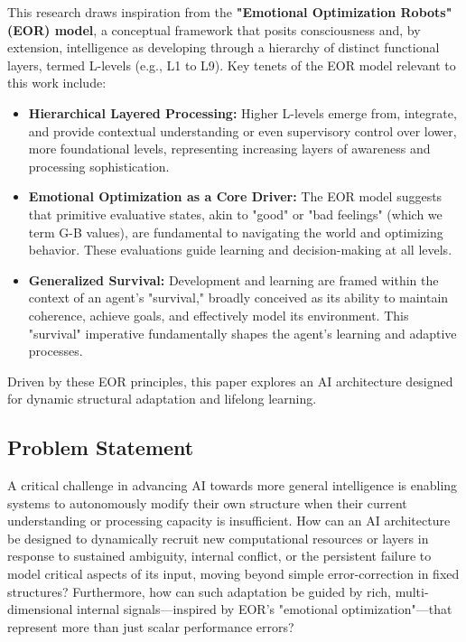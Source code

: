 \documentclass{article}
\begin{document}
This research draws inspiration from the \textbf{"Emotional Optimization Robots" (EOR) model}, a conceptual framework that posits consciousness and, by extension, intelligence as developing through a hierarchy of distinct functional layers, termed L-levels (e.g., L1 to L9). Key tenets of the EOR model relevant to this work include:
\begin{itemize}
    \item \textbf{Hierarchical Layered Processing:} Higher L-levels emerge from, integrate, and provide contextual understanding or even supervisory control over lower, more foundational levels, representing increasing layers of awareness and processing sophistication.
    \item \textbf{Emotional Optimization as a Core Driver:} The EOR model suggests that primitive evaluative states, akin to "good" or "bad feelings" (which we term G-B values), are fundamental to navigating the world and optimizing behavior. These evaluations guide learning and decision-making at all levels.
    \item \textbf{Generalized Survival:} Development and learning are framed within the context of an agent's "survival," broadly conceived as its ability to maintain coherence, achieve goals, and effectively model its environment. This "survival" imperative fundamentally shapes the agent's learning and adaptive processes.
\end{itemize}
Driven by these EOR principles, this paper explores an AI architecture designed for dynamic structural adaptation and lifelong learning.

\subsection{Problem Statement}
A critical challenge in advancing AI towards more general intelligence is enabling systems to autonomously modify their own structure when their current understanding or processing capacity is insufficient. How can an AI architecture be designed to dynamically recruit new computational resources or layers in response to sustained ambiguity, internal conflict, or the persistent failure to model critical aspects of its input, moving beyond simple error-correction in fixed structures? Furthermore, how can such adaptation be guided by rich, multi-dimensional internal signals—inspired by EOR's "emotional optimization"—that represent more than just scalar performance errors?
\end{document}
